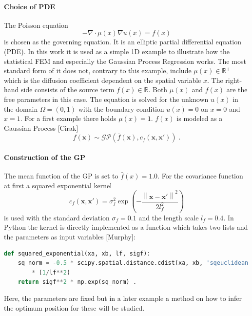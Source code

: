 \documentclass[%
  a4paper,oneside,%
  11pt,%
  smallchapters,
  green,%
  rgb, <cmyk>
  ,]{tubsbook}
\begin{document}
\paragraph{Choice of PDE}
The Poisson equation 
\begin{equation}
- \nabla \cdot \mu(x) \nabla u(x) = f(x)
\label{eqn:Poisson}
\end{equation}
is chosen as the governing equation. It is an elliptic partial differential equation (PDE). In this work it is used as a simple 1D example to illustrate how the statistical FEM and especially the Gaussian Process Regression works.
The most standard form of it does not, contrary to this example, include $\mu(x) \in \mathbb{R}^+$ which is the diffusion coefficient dependent on the spatial variable $x$. The right-hand side consists of the source term $f(x)\in \mathbb{R}$. Both $\mu (x)$ and $f(x)$ are the free parameters in this case. The equation is solved for the unknown  $u(x)$ in the domain $\Omega = (0,1)$ with the boundary condition $u(x) = 0$ on $x=0$ and $x=1$.
%
For a first example there holds $\mu(x)=1$. $f(x)$ is modeled as a Gaussian Process [Cirak]
%
\begin{equation}
f(\bm{x}) \sim \mathcal{GP} \left( \bar{f}(\bm{x}), c_f(\bm{x},\bm{x}')\right) \;.
\end{equation}
%
\paragraph{Construction of the GP}
The mean function of the GP is set to $\bar{f}(x) = 1.0$. For the covariance function at first a squared exponential kernel 
%
\begin{equation}
c_f(\bm{x},\bm{x}') =    \sigma_{f}^2 \exp \left(-  \frac{\left \| \bm{x}-{\bm{x}}' \right \|^2}{2l_{f}^2} \right )       
\label{eqn:sqEx_f}
\end{equation}
%
is used with the standard deviation $\sigma_{f} = 0.1$ and the length scale $l_{f} = 0.4$.
In Python the kernel is directly implemented as a function which takes two lists and the parameters as input variables [Murphy]:
\begin{lstlisting}[language=Python]
def squared_exponential(xa, xb, lf, sigf):
    sq_norm = -0.5 * scipy.spatial.distance.cdist(xa, xb, 'sqeuclidean') \
    	* (1/lf**2)
    return sigf**2 * np.exp(sq_norm) .
\end{lstlisting}
\label{lst:sqEx}
%
Here, the parameters are fixed but in a later example a method on how to infer the optimum position for these will be studied.
\end{document}
